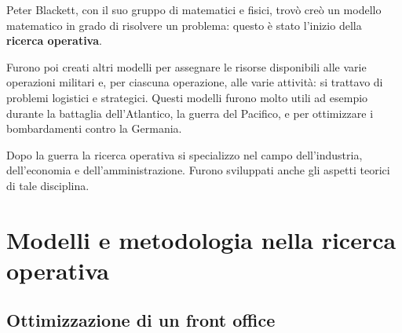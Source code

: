 \documentclass[11pt]{book}
\begin{document}
Peter Blackett, con il suo gruppo di matematici e fisici, trov\`o cre\`o
un modello matematico in grado di risolvere un problema: questo \`e
stato l'inizio della {\bf ricerca operativa}.

Furono poi creati altri modelli per assegnare le risorse disponibili
alle varie operazioni militari e, per ciascuna operazione, alle varie
attivit\`a: si trattavo di problemi logistici e strategici. Questi
modelli furono molto utili ad esempio durante la battaglia
dell'Atlantico, la guerra del Pacifico, e per ottimizzare i
bombardamenti contro la Germania.

Dopo la guerra la ricerca operativa si specializzo nel campo
dell'industria, dell'economia e dell'amministrazione. Furono
sviluppati anche gli aspetti teorici di tale disciplina.


\section{Modelli e metodologia nella ricerca operativa}

\subsection{Ottimizzazione di un front office}
\end{document}

